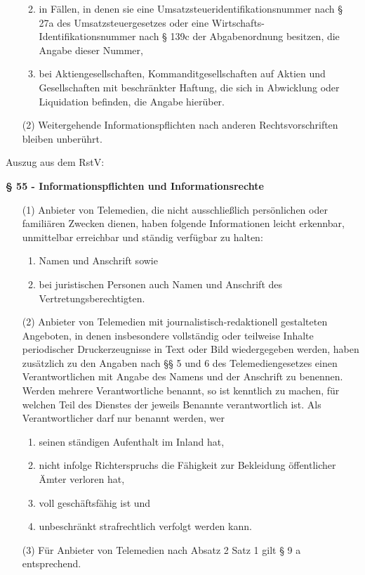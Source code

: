 \documentclass[12pt, twoside, a4paper, ngerman]{article}
\begin{document}
\begin{appendix}
\begin{itemize}
\begin{enumerate}
\begin{itemize}
    \end{itemize}
    \item in Fällen, in denen sie eine Umsatzsteueridentifikationsnummer nach § 27a des Umsatzsteuergesetzes oder eine Wirtschafts-Identifikationsnummer nach § 139c der Abgabenordnung besitzen, die Angabe dieser Nummer,
    \item bei Aktiengesellschaften, Kommanditgesellschaften auf Aktien und Gesellschaften mit beschränkter Haftung, die sich in Abwicklung oder Liquidation befinden, die Angabe hierüber.
  \end{enumerate}
\item[(2)] Weitergehende Informationspflichten nach anderen Rechtsvorschriften bleiben unberührt.
\end{itemize}

Auszug aus dem \ac{RstV}:

\textbf{§ 55 - Informationspflichten und Informationsrechte}
\begin{itemize}
  \item[(1)] Anbieter von Telemedien, die nicht ausschließlich persönlichen oder familiären Zwecken dienen, haben folgende Informationen leicht erkennbar, unmittelbar erreichbar und ständig verfügbar zu halten:
  \begin{enumerate}
    \item Namen und Anschrift sowie
    \item bei juristischen Personen auch Namen und Anschrift des Vertretungsberechtigten.
  \end{enumerate}
  \item[(2)] Anbieter von Telemedien mit journalistisch-redaktionell gestalteten Angeboten, in denen insbesondere vollständig oder teilweise Inhalte periodischer Druckerzeugnisse in Text oder Bild wiedergegeben werden, haben zusätzlich zu den Angaben nach §§ 5 und 6 des Telemediengesetzes einen Verantwortlichen mit Angabe des Namens und der Anschrift zu benennen. Werden mehrere Verantwortliche benannt, so ist kenntlich zu machen, für welchen Teil des Dienstes der jeweils Benannte verantwortlich ist. Als Verantwortlicher darf nur benannt werden, wer
  \begin{enumerate}
    \item seinen ständigen Aufenthalt im Inland hat,
    \item nicht infolge Richterspruchs die Fähigkeit zur Bekleidung öffentlicher Ämter verloren hat,
    \item voll geschäftsfähig ist und
    \item unbeschränkt strafrechtlich verfolgt werden kann.
  \end{enumerate}
  \item[(3)] Für Anbieter von Telemedien nach Absatz 2 Satz 1 gilt § 9 a entsprechend.
\end{itemize}


\end{appendix}
\end{document}

